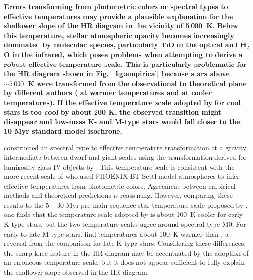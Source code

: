 \documentclass{aa}
\begin{document}
{\bf Errors transforming from photometric colors or spectral types to effective temperatures may provide a plausible explanation for the shallower slope of the HR diagram in the vicinity of 5\,000~K. Below this temperature, stellar atmospheric opacity becomes increasingly dominated by molecular species, particularly TiO in the optical and H$_2$O in the infrared, which poses problems when attempting to derive a robust effective temperature scale. This is particularly problematic for the HR diagram shown in Fig.~\ref{fig:empirical} because stars above \teff$ \sim 5\,000$~K were transformed from the observational to theoretical plane by different authors (\citealt{Pecaut2012} at warmer temperatures and \citealt{Preibisch1999} at cooler temperatures). If the effective temperature scale adopted by \citet{Preibisch1999} for cool stars is too cool by about 200 K, the observed transition might disappear and low-mass K- and M-type stars would fall closer to the 10 Myr standard model isochrone.

\citet{Preibisch1999} constructed an spectral type to effective temperature transformation at a gravity intermediate between dwarf and giant scales using the transformation derived for luminosity class IV objects by \citet{deJager1987}. This temperature scale is consistent with the more recent scale of \citet{Herczeg2015} who used PHOENIX BT-Settl model atmospheres \citep{Allard2011} to infer effective temperatures from photometric colors. Agreement between empirical methods and theoretical predictions is reassuring. However,
comparing these results to the 5 -- 30 Myr pre-main-sequence star temperature scale proposed by \citet{Pecaut2013}, one finds that the temperature scale adopted by \citeauthor{Preibisch1999} is about 100~K cooler for early K-type stars, but the two temperature scales agree around spectral type M0. For early-to-late M-type stars, \citeauthor{Preibisch1999} find temperatures about 100~K warmer than \citet{Pecaut2013}, a reversal from the comparison for late-K-type stars. Considering these differences, the sharp knee feature in the HR diagram may be accentuated by the adoption of an erroneous temperature scale, but it does not appear sufficient to fully explain the shallower slope observed in the HR diagram.
} 
\end{document}
